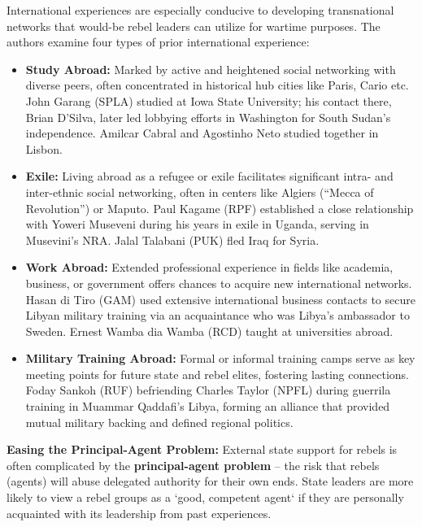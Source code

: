 \documentclass{article}
\begin{document}
    \noindent International experiences are especially conducive to
developing transnational networks that would-be rebel leaders can utilize
for wartime purposes. The authors examine four types of prior international
experience:

    \begin{itemize}
        \item \textbf{Study Abroad:} Marked by active and heightened social
        networking with diverse peers, often concentrated in historical hub
        cities like Paris, Cario etc. John Garang (SPLA) studied at Iowa
        State University; his contact there, Brian D'Silva, later led
        lobbying efforts in Washington for South Sudan's independence.
        Amilcar Cabral and Agostinho Neto studied together in Lisbon.
        \item \textbf{Exile:} Living abroad as a refugee or exile
        facilitates significant intra- and inter-ethnic social networking,
        often in centers like Algiers (``Mecca of Revolution'') or Maputo.
        Paul Kagame (RPF) established a close relationship with Yoweri
        Museveni during his years in exile in Uganda, serving in Musevini's
        NRA. Jalal Talabani (PUK) fled Iraq for Syria.
        \item \textbf{Work Abroad:} Extended professional experience in
        fields like academia, business, or government offers chances to
        acquire new international networks. Hasan di Tiro (GAM) used
        extensive international business contacts to secure Libyan military
        training via an acquaintance who was Libya's ambassador to Sweden.
        Ernest Wamba dia Wamba (RCD) taught at universities abroad.
        \item \textbf{Military Training Abroad:} Formal or informal training
        camps serve as key meeting points for future state and rebel elites,
        fostering lasting connections. Foday Sankoh (RUF) befriending
        Charles Taylor (NPFL) during guerrila training in Muammar Qaddafi's
        Libya, forming an alliance that provided mutual military backing and
        defined regional politics.
    \end{itemize}

    \noindent \textbf{Easing the Principal-Agent Problem:} External state
support for rebels is often complicated by the
\textbf{principal-agent problem} -- the risk that rebels (agents) will abuse
delegated authority for their own ends. State leaders are more likely to
view a rebel groups as a `good, competent agent` if they are personally
acquainted with its leadership from past experiences.
\end{document}
